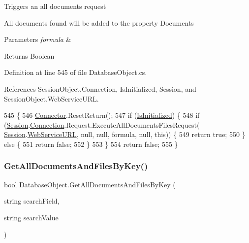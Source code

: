 Triggers an all documents request

All documents found will be added to the property \textquotesingle{}Documents\textquotesingle{}


\begin{DoxyParams}{Parameters}
{\em formula} & \\
\hline
\end{DoxyParams}
\begin{DoxyReturn}{Returns}
Boolean
\end{DoxyReturn}


Definition at line 545 of file Database\+Object.\+cs.



References Session\+Object.\+Connection, Is\+Initialized, Session, and Session\+Object.\+Web\+Service\+U\+RL.


\begin{DoxyCode}
545                                                                  \{
546         \mbox{\hyperlink{class_connector}{Connector}}.ResetReturn();
547         \textcolor{keywordflow}{if} (\mbox{\hyperlink{class_database_object_a5fe036d32a30eb10d1b3f6a30263f740}{IsInitialized}}) \{
548             \textcolor{keywordflow}{if} (\mbox{\hyperlink{class_database_object_aa8484162b7d2a7c4c9426bca13c64c07}{Session}}.\mbox{\hyperlink{class_session_object_a014bdbf705a753540e19bfb53030c55c}{Connection}}.Request.ExecuteAllDocumentsFilesRequest(
      \mbox{\hyperlink{class_database_object_aa8484162b7d2a7c4c9426bca13c64c07}{Session}}.\mbox{\hyperlink{class_session_object_a697c071c812fbf7ad1166b896fb44c16}{WebServiceURL}}, null, null, formula, null, \textcolor{keyword}{this})) \{
549                 \textcolor{keywordflow}{return} \textcolor{keyword}{true};
550             \} \textcolor{keywordflow}{else} \{
551                 \textcolor{keywordflow}{return} \textcolor{keyword}{false};
552             \}
553         \}
554         \textcolor{keywordflow}{return} \textcolor{keyword}{false};
555     \}
\end{DoxyCode}
\mbox{\label{class_database_object_a6c2fb05fb6972d74d5bea67e323985fb}} 
\subsubsection{\texorpdfstring{Get\+All\+Documents\+And\+Files\+By\+Key()}{GetAllDocumentsAndFilesByKey()}}
{\footnotesize\ttfamily bool Database\+Object.\+Get\+All\+Documents\+And\+Files\+By\+Key (\begin{DoxyParamCaption}\item[{string}]{search\+Field,  }\item[{string}]{search\+Value }\end{DoxyParamCaption})}



